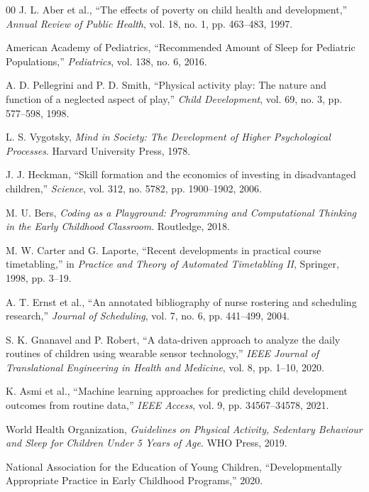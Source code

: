 \documentclass[10pt,conference,compsocconf]{IEEEtran}
\begin{document}
\begin{thebibliography}{00}
 J. L. Aber et al., ``The effects of poverty on child health and development,'' \textit{Annual Review of Public Health}, vol. 18, no. 1, pp. 463--483, 1997.

 American Academy of Pediatrics, ``Recommended Amount of Sleep for Pediatric Populations,'' \textit{Pediatrics}, vol. 138, no. 6, 2016.

 A. D. Pellegrini and P. D. Smith, ``Physical activity play: The nature and function of a neglected aspect of play,'' \textit{Child Development}, vol. 69, no. 3, pp. 577--598, 1998.

 L. S. Vygotsky, \textit{Mind in Society: The Development of Higher Psychological Processes}. Harvard University Press, 1978.

 J. J. Heckman, ``Skill formation and the economics of investing in disadvantaged children,'' \textit{Science}, vol. 312, no. 5782, pp. 1900--1902, 2006.

 M. U. Bers, \textit{Coding as a Playground: Programming and Computational Thinking in the Early Childhood Classroom}. Routledge, 2018.

 M. W. Carter and G. Laporte, ``Recent developments in practical course timetabling,'' in \textit{Practice and Theory of Automated Timetabling II}, Springer, 1998, pp. 3--19.

 A. T. Ernst et al., ``An annotated bibliography of nurse rostering and scheduling research,'' \textit{Journal of Scheduling}, vol. 7, no. 6, pp. 441--499, 2004.

 S. K. Gnanavel and P. Robert, ``A data-driven approach to analyze the daily routines of children using wearable sensor technology,'' \textit{IEEE Journal of Translational Engineering in Health and Medicine}, vol. 8, pp. 1--10, 2020.

 K. Asmi et al., ``Machine learning approaches for predicting child development outcomes from routine data,'' \textit{IEEE Access}, vol. 9, pp. 34567--34578, 2021.

 World Health Organization, \textit{Guidelines on Physical Activity, Sedentary Behaviour and Sleep for Children Under 5 Years of Age}. WHO Press, 2019.

 National Association for the Education of Young Children, ``Developmentally Appropriate Practice in Early Childhood Programs,'' 2020.


\end{thebibliography}
\end{document}
